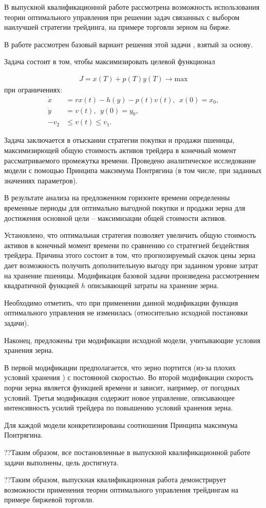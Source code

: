 В выпускной квалификационной работе рассмотрена возможность использования теории оптимального управления при решении задач связанных с выбором наилучшей стратегии трейдинга, на примере торговли зерном на бирже.


В работе рассмотрен базовый вариант решения этой задачи \cite{b8}, взятый за основу. 

Задача состоит в том, чтобы максимизировать целевой функционал

\begin{align}
    J = x(T) + p(T) y(T)\to \mathrm{max} \nonumber
\end{align} 
при ограничениях:
\begin{align}
    \Dot{x} & = r x(t) - h(y) - p(t) v(t),\,\; x(0) = x_{0}, \nonumber\\
    \Dot{y} & = v(t), \,\; y(0) = y_{0}, \nonumber \\
    - v_2 & \le v(t) \le v_1. \nonumber
\end{align}    

Задача заключается в отыскании стратегии покупки и продажи пшеницы,  максимизирющей общую стоимость активов трейдера в конечный момент рассматриваемого промежутка времени. Проведено аналитическое исследование модели с помощью Принципа максимума Понтрягина (в том числе, при заданных значениях параметров).


В результате анализа на предложенном горизонте времени определенны временные периоды для оптимально выгодной покупки и продажи зерна для достижения основной цели – максимизации общей стоимости активов.


Установлено, что оптимальная стратегия позволяет увеличить общую стоимость активов в конечный момент времени по сравнению со стратегией бездействия трейдера. Причина этого состоит в том, что прогнозируемый скачок цены зерна дает возможность получить дополнительную выгоду при заданном уровне затрат на хранение пшеницы. Модификация базовой задачи произведена рассмотрением  квадратичной функцией $h$ описывающей затраты на хранение зерна.


Необходимо отметить, что при применении данной модификации функция оптимального управления не изменилась (относительно исходной постановки задачи).

Наконец, предложены три модификации исходной модели, учитывающие условия хранения зерна.


В первой модификации предполагается, что зерно портится (из-за плохих условий хранения ) с постоянной скоростью. Во второй модификации скорость порчи зерна является функцией времени и зависит, например, от погодных условий. Третья модификация содержит новое управление, описывающее интенсивность усилий трейдера по повышению условий хранения зерна.


Для каждой модели конкретизированы соотношения Принципа максимума Понтрягина.


??Таким образом, все постановленные в выпускной квалификационной работе задачи выполнены, цель достигнута.

??Таким образом, выпускная квалификационная  работа демонстрирует возможности применения теории оптимального управления трейдингам на примере биржевой торговли.
